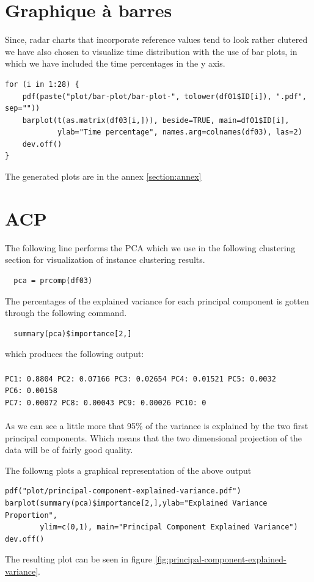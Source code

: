 \documentclass[11pt]{article}
\begin{document}
\section{Graphique à barres}
Since, radar charts that incorporate reference values tend to look rather
clutered we have also chosen to visualize time distribution with the use of bar
plots, in which we have included the time percentages in the y axis.
\begin{verbatim}
for (i in 1:28) {
    pdf(paste("plot/bar-plot/bar-plot-", tolower(df01$ID[i]), ".pdf", sep=""))
    barplot(t(as.matrix(df03[i,])), beside=TRUE, main=df01$ID[i],
            ylab="Time percentage", names.arg=colnames(df03), las=2)
    dev.off()
}
\end{verbatim}
The generated plots are in the annex \ref{section:annex}
\section{ACP}
The following line performs the PCA which we use in the following clustering
section for visualization of instance clustering results.
\begin{verbatim}
  pca = prcomp(df03)
\end{verbatim}
The percentages of the explained variance for each principal component is gotten
through the following command.
\begin{verbatim}
  summary(pca)$importance[2,]
\end{verbatim}
which produces the following output:\\\\ \texttt{PC1:\ 0.8804 PC2:\ 0.07166
  PC3:\ 0.02654 PC4:\ 0.01521 PC5:\ 0.0032 PC6:\ 0.00158 \\PC7:\ 0.00072
  PC8:\ 0.00043 PC9:\ 0.00026 PC10:\ 0}\\\\ As we can see a little more that
95\% of the variance is explained by the two first principal components. Which
means that the two dimensional projection of the data will be of fairly good
quality.\par The followng plots a graphical representation of the above output
\begin{verbatim}
pdf("plot/principal-component-explained-variance.pdf")
barplot(summary(pca)$importance[2,],ylab="Explained Variance Proportion",
        ylim=c(0,1), main="Principal Component Explained Variance")
dev.off()   
\end{verbatim}
The resulting plot can be seen in figure
\ref{fig:principal-component-explained-variance}.\par
\end{document}
